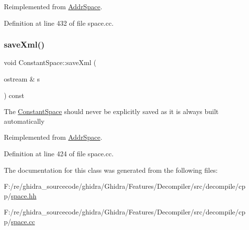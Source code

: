 Reimplemented from \mbox{\hyperlink{class_addr_space_aa2fe50d288eef7ea713cce99774c4eca}{Addr\+Space}}.



Definition at line 432 of file space.\+cc.

\mbox{\label{class_constant_space_a8af99121cbd9e7cea687d2a54cb98157}} 
\subsubsection{\texorpdfstring{saveXml()}{saveXml()}}
{\footnotesize\ttfamily void Constant\+Space\+::save\+Xml (\begin{DoxyParamCaption}\item[{ostream \&}]{s }\end{DoxyParamCaption}) const\hspace{0.3cm}{\ttfamily [virtual]}}

The \mbox{\hyperlink{class_constant_space}{Constant\+Space}} should never be explicitly saved as it is always built automatically 

Reimplemented from \mbox{\hyperlink{class_addr_space_ac073a4d446677c54d769abba01318864}{Addr\+Space}}.



Definition at line 424 of file space.\+cc.



The documentation for this class was generated from the following files\+:\begin{DoxyCompactItemize}
\item 
F\+:/re/ghidra\+\_\+sourcecode/ghidra/\+Ghidra/\+Features/\+Decompiler/src/decompile/cpp/\mbox{\hyperlink{space_8hh}{space.\+hh}}\item 
F\+:/re/ghidra\+\_\+sourcecode/ghidra/\+Ghidra/\+Features/\+Decompiler/src/decompile/cpp/\mbox{\hyperlink{space_8cc}{space.\+cc}}\end{DoxyCompactItemize}
